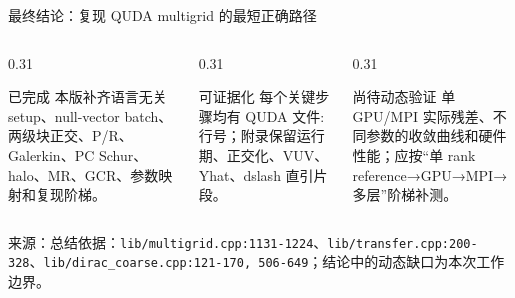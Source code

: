 \documentclass[UTF8,aspectratio=169,11pt]{ctexbeamer}
\newcommand{\source}[1]{\vspace{0.05em}\par{\raggedright\scriptsize\color{muted}来源：#1\par}}
\newcommand{\codepath}[1]{\nolinkurl{#1}}
\begin{document}
\begin{frame}[t]{最终结论：复现 QUDA multigrid 的最短正确路径}
  \begin{center}
  \end{center}
  \vspace{0.16cm}
  \begin{columns}[T,totalwidth=\textwidth]
    \begin{column}{0.31\textwidth}
      \begin{block}{已完成}
        本版补齐语言无关 setup、null-vector batch、两级块正交、P/R、Galerkin、PC Schur、halo、MR、GCR、参数映射和复现阶梯。
      \end{block}
    \end{column}
    \begin{column}{0.31\textwidth}
      \begin{block}{可证据化}
        每个关键步骤均有 QUDA 文件:行号；附录保留运行期、正交化、VUV、Yhat、dslash 直引片段。
      \end{block}
    \end{column}
    \begin{column}{0.31\textwidth}
      \begin{alertblock}{尚待动态验证}
        单 GPU/MPI 实际残差、不同参数的收敛曲线和硬件性能；应按“单 rank reference→GPU→MPI→多层”阶梯补测。
      \end{alertblock}
    \end{column}
  \end{columns}
  \source{总结依据：\codepath{lib/multigrid.cpp:1131-1224}、\codepath{lib/transfer.cpp:200-328}、\codepath{lib/dirac_coarse.cpp:121-170, 506-649}；结论中的动态缺口为本次工作边界。}
\end{frame}
\end{document}
